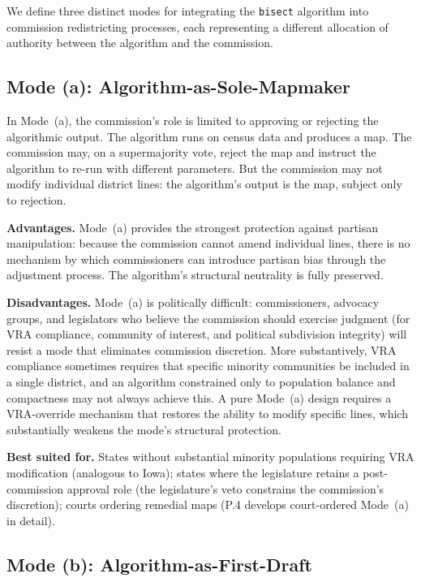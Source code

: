 We define three distinct modes for integrating the \texttt{bisect} algorithm into commission redistricting processes, each representing a different allocation of authority between the algorithm and the commission.

\subsection{Mode (a): Algorithm-as-Sole-Mapmaker}

In Mode~(a), the commission's role is limited to approving or rejecting the algorithmic output. The algorithm runs on census data and produces a map. The commission may, on a supermajority vote, reject the map and instruct the algorithm to re-run with different parameters. But the commission may not modify individual district lines: the algorithm's output is the map, subject only to rejection.

\textbf{Advantages.} Mode~(a) provides the strongest protection against partisan manipulation: because the commission cannot amend individual lines, there is no mechanism by which commissioners can introduce partisan bias through the adjustment process. The algorithm's structural neutrality is fully preserved.

\textbf{Disadvantages.} Mode~(a) is politically difficult: commissioners, advocacy groups, and legislators who believe the commission should exercise judgment (for VRA compliance, community of interest, and political subdivision integrity) will resist a mode that eliminates commission discretion. More substantively, VRA compliance sometimes requires that specific minority communities be included in a single district, and an algorithm constrained only to population balance and compactness may not always achieve this. A pure Mode~(a) design requires a VRA-override mechanism that restores the ability to modify specific lines, which substantially weakens the mode's structural protection.

\textbf{Best suited for.} States without substantial minority populations requiring VRA modification (analogous to Iowa); states where the legislature retains a post-commission approval role (the legislature's veto constrains the commission's discretion); courts ordering remedial maps (P.4 develops court-ordered Mode~(a) in detail).

\subsection{Mode (b): Algorithm-as-First-Draft}

